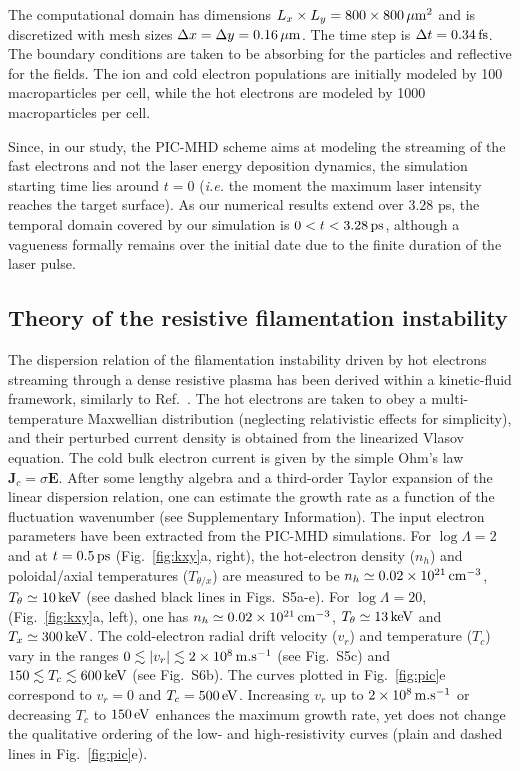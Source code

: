 \documentclass[aps,twocolumn,showpacs,superscriptaddress]{revtex4}
\begin{document}
The computational domain has dimensions
$L_x\times L_y=800 \times 800\,\rm \mu m^2$ and is discretized with mesh sizes $\Delta x=\Delta y =0.16\,\rm \mu m$. The time step is $\Delta t=0.34\,\rm fs$. The boundary conditions are taken to be absorbing for the particles and reflective for the fields. The ion and cold electron populations are initially modeled by 100 macroparticles per cell, while the hot electrons are modeled by 1000 macroparticles per cell. 

Since, in our study, the PIC-MHD scheme aims at modeling the streaming of the fast electrons and not the laser energy deposition dynamics, the simulation starting time lies around $t = 0$ (\emph{i.e.} the moment the maximum laser intensity reaches the target surface). As our numerical results extend over $3.28$ ps, the temporal domain covered by our simulation is $0 < t < 3.28\, \rm ps$, although a vagueness formally remains over the initial date due to the finite duration of the laser pulse. 

\subsection*{Theory of the resistive filamentation instability}

The dispersion relation of the filamentation instability driven by hot electrons streaming through a dense resistive plasma has been derived within a kinetic-fluid framework, similarly to Ref.~\cite{POP_Gremillet_2002}. The hot electrons are taken to obey a multi-temperature Maxwellian distribution (neglecting relativistic effects for simplicity), and their perturbed current density is obtained from the linearized Vlasov equation. The cold bulk electron current is given by the simple Ohm's law $\mathbf{J}_c=\sigma \mathbf{E}$.
After some lengthy algebra and a third-order Taylor expansion of the linear dispersion relation, one can estimate the growth rate as a function of the fluctuation wavenumber (see Supplementary Information). The input electron parameters have been extracted from the PIC-MHD simulations. For $\log \Lambda=2$ and at $t=0.5\,\rm ps$ (Fig.~\ref{fig:kxy}a, right), the hot-electron density ($n_h$) and poloidal/axial temperatures ($T_{\theta/x}$) are measured to  be $n_h\simeq 0.02 \times 10^{21}\,\rm cm^{-3}$, $T_\theta \simeq 10\,\rm keV$ (see dashed black lines in Figs.~S5a-e). For $\log \Lambda =20$, (Fig.~\ref{fig:kxy}a, left), one has $n_h \simeq 0.02 \times 10^{21}\,\rm cm^{-3}$,  $T_\theta \simeq 13\,\rm keV$ and $T_x \simeq 300\,\rm keV$. The cold-electron radial drift velocity ($v_r$) and temperature ($T_c$) vary in the ranges $0\lesssim \vert v_r \vert \lesssim 2\times 10^8 \,\rm m.s^{-1}$ (see Fig.~S5c) and $150 \lesssim T_c \lesssim 600\,\rm keV$ (see Fig.~S6b). The curves plotted in Fig.~\ref{fig:pic}e correspond to $v_r = 0$ and $T_c=500\,\rm eV$.
Increasing $v_r$ up to $2\times 10^8 \,\rm m.s^{-1}$ or decreasing $T_c$ to $150\,\rm eV$ enhances the maximum growth rate, yet does not change the qualitative ordering of the low- and high-resistivity curves (plain and dashed lines in Fig.~\ref{fig:pic}e).
\end{document}
